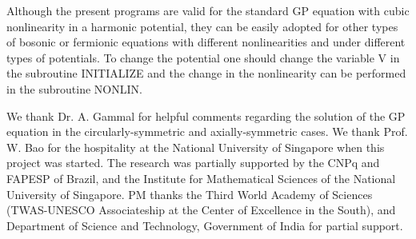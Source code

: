 \documentclass[onecolumn]{elsart3p}
\begin{document}
Although the present programs are valid for   the standard GP equation
with cubic nonlinearity in a harmonic potential, they can be easily
adopted for other types of
bosonic \cite{tg} or fermionic equations \cite{ska1,ska2} with different
nonlinearities and under
different types of potentials. To change the potential one should change
the variable V in the subroutine INITIALIZE and the change in the
nonlinearity can be performed in the subroutine NONLIN.




\ack

We thank Dr. A. Gammal for helpful comments regarding the
solution of the GP equation in the circularly-symmetric and
axially-symmetric cases.
We thank Prof. W. Bao for the hospitality at the National University of
Singapore when this project was started. The research was partially
supported by the CNPq and FAPESP of Brazil, and the Institute for
Mathematical Sciences of the National University of Singapore.
PM thanks  the Third World Academy of Sciences (TWAS-UNESCO
Associateship at the Center of Excellence in the South), and Department
of Science and Technology, Government of India for partial
support.
\end{document}
